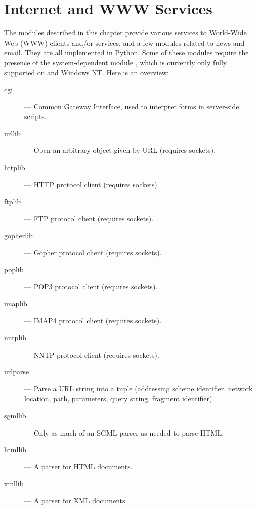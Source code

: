 \chapter{Internet and WWW Services}
\label{www}

The modules described in this chapter provide various services to
World-Wide Web (WWW) clients and/or services, and a few modules
related to news and email.  They are all implemented in Python.  Some
of these modules require the presence of the system-dependent module
, which is currently only fully
supported on \UNIX{} and Windows NT.  Here is an overview:

\begin{description}

\item[cgi]
--- Common Gateway Interface, used to interpret forms in server-side
scripts.

\item[urllib]
--- Open an arbitrary object given by URL (requires sockets).

\item[httplib]
--- HTTP protocol client (requires sockets).

\item[ftplib]
--- FTP protocol client (requires sockets).

\item[gopherlib]
--- Gopher protocol client (requires sockets).

\item[poplib]
--- POP3 protocol client (requires sockets).

\item[imaplib]
--- IMAP4 protocol client (requires sockets).

\item[nntplib]
--- NNTP protocol client (requires sockets).

\item[urlparse]
--- Parse a URL string into a tuple (addressing scheme identifier, network
location, path, parameters, query string, fragment identifier).

\item[sgmllib]
--- Only as much of an SGML parser as needed to parse HTML.

\item[htmllib]
--- A parser for HTML documents.

\item[xmllib]
--- A parser for XML documents.


\end{description}
